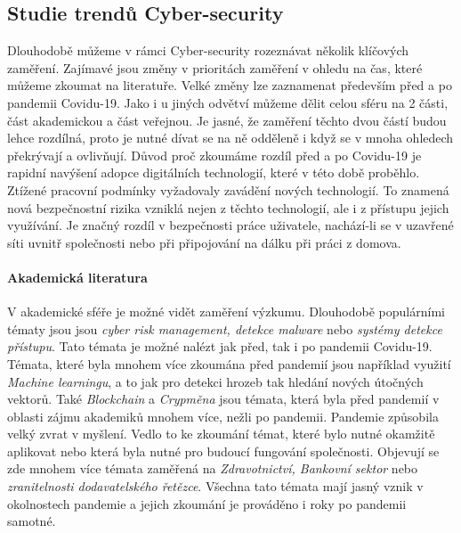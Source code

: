 \subsection{Studie trendů Cyber-security}
Dlouhodobě můžeme v rámci Cyber-security rozeznávat několik klíčových zaměření.
Zajímavé jsou změny v prioritách zaměření v ohledu na čas, které můžeme zkoumat na literatuře.
Velké změny lze zaznamenat především před a po pandemii Covidu-19.\cite{KUMAR2022102821}
Jako i u jiných odvětví můžeme dělit celou sféru na 2 části, část akademickou a část veřejnou.
Je jasné, že zaměření těchto dvou částí budou lehce rozdílná, proto je nutné dívat se na ně odděleně i když se v mnoha ohledech překrývají a ovlivňují.
Důvod proč zkoumáme rozdíl před a po Covidu-19 je rapidní navýšení adopce digitálních technologií, které v této době proběhlo.
Ztížené pracovní podmínky vyžadovaly zavádění nových technologií.
To znamená nová bezpečnostní rizika vzniklá nejen z těchto technologií, ale i z přístupu jejich využívání.
Je značný rozdíl v bezpečnosti práce uživatele, nachází-li se v uzavřené síti uvnitř společnosti nebo při připojování na dálku při práci z domova.

\paragraph{Akademická literatura}
V akademické sféře je možné vidět zaměření výzkumu.
Dlouhodobě populárními tématy jsou jsou \textit{cyber risk management, detekce malware} nebo \textit{systémy detekce přístupu}.\cite{KUMAR2022102821}
Tato témata je možné nalézt jak před, tak i po pandemii Covidu-19.
Témata, které byla mnohem více zkoumána před pandemií jsou například využití \textit{Machine learningu}, a to jak pro detekci hrozeb tak hledání nových útočných vektorů.
Také \textit{Blockchain} a \textit{Crypměna} jsou témata, která byla před pandemií v oblasti zájmu akademiků mnohem více, nežli po pandemii.\cite{KUMAR2022102821}
Pandemie způsobila velký zvrat v myšlení.
Vedlo to ke zkoumání témat, které bylo nutné okamžitě aplikovat nebo která byla nutné pro budoucí fungování společnosti.
Objevují se zde mnohem více témata zaměřená na \textit{Zdravotnictví, Bankovní sektor} nebo \textit{zranitelnosti dodavatelského řetězce}.\cite{KUMAR2022102821}
Všechna tato témata mají jasný vznik v okolnostech pandemie a jejich zkoumání je prováděno i roky po pandemii samotné.

